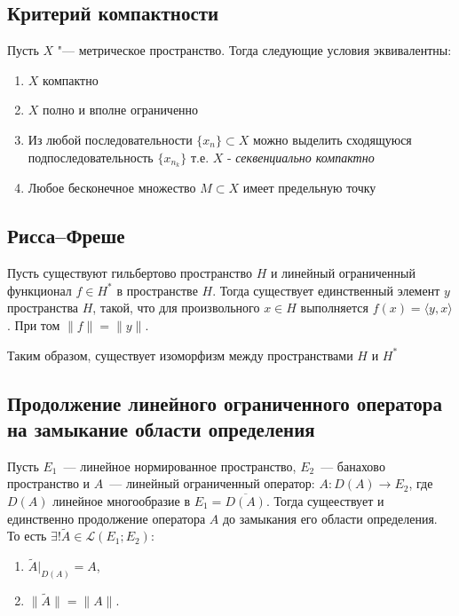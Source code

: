 \subsection{Критерий компактности}
\begin{theorem}\label{thm3.2}
    Пусть $X$ "--- метрическое пространство. Тогда следующие условия эквивалентны:
    \begin{enumerate}
        \item $X$ компактно
        \item $X$ полно и вполне ограниченно
        \item Из любой последовательности $\{x_n\} \subset X$ можно выделить сходящуюся подпоследовательность $\{x_{n_k}\}$ т.е. $X$ - \textit{секвенциально компактно}
        \item Любое бесконечное множество $M \subset X$ имеет предельную точку
    \end{enumerate}
\end{theorem}


\subsection{Рисса--Фреше}
\begin{theorem}\label{Riss-Freshe} Пусть существуют гильбертово пространство \(H\) и линейный ограниченный функционал \(f \in H^*\) в пространстве \(H\). Тогда существует единственный элемент \(y\) пространства \(H\), такой, что для произвольного \(x \in H\) выполняется \(f(x)=\langle y,x\rangle\). При том \(\|f\| = \|y\|\).
\end{theorem}
\begin{note}
Таким образом, существует изоморфизм между пространствами $H$ и $H^*$
\end{note}

\subsection{Продолжение линейного ограниченного оператора на замыкание области определения}

\begin{theorem}[5.3]\label{extrapolate-to-closure}
    Пусть $E_1$~--- линейное нормированное пространство, $E_2$~--- банахово пространство и $A$~--- линейный ограниченный оператор: $A: D(A) \to E_2$, где $D(A)$ линейное многообразие в $E_1 = \overline{D(A)}$. Тогда сущеествует и единственно продолжение оператора $A$ до замыкания его области определения.\\
    То есть $\exists! \widetilde{A} \in \mathcal{L}(E_1; E_2)$:
    \begin{enumerate}
        \item $ \widetilde{A}\rvert_{D(A)} = A$,
        \item $\|\widetilde{A}\| = \|A\|$.
    \end{enumerate}
\end{theorem}

